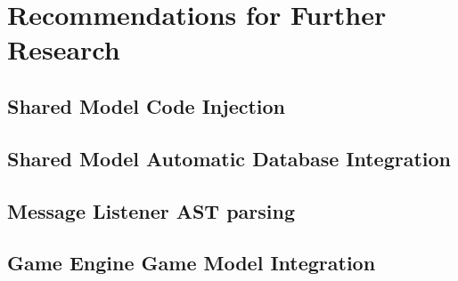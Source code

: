 \section{Recommendations for Further Research}

\subsection{Shared Model Code Injection}
\label{sub:model_code_injection}

\subsection{Shared Model Automatic Database Integration}

\subsection{Message Listener AST parsing}

\subsection{Game Engine Game Model Integration}